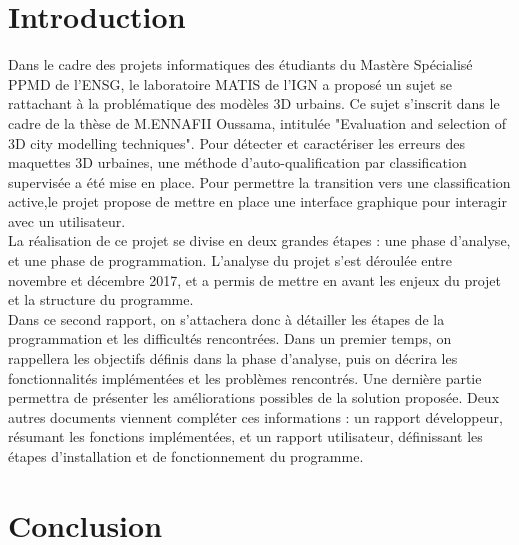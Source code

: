\documentclass{themeensg}
\begin{document}
\newpage
\chapter*{Introduction}
  
  \vspace{1.5cm}
Dans le cadre des projets informatiques des étudiants du Mastère Spécialisé PPMD de l’ENSG,
le laboratoire MATIS de l’IGN a proposé un sujet se rattachant à la problématique des modèles 3D
urbains. Ce sujet s’inscrit dans le cadre de la thèse de M.ENNAFII Oussama, intitulée "Evaluation and selection of 3D city modelling techniques". Pour détecter et caractériser les erreurs des maquettes 3D urbaines, une méthode d’auto-qualification par classification supervisée a été mise en place. Pour permettre la transition vers une classification active,le projet propose de mettre en place une interface graphique pour interagir avec un utilisateur.\\

La réalisation de ce projet se divise en deux grandes étapes : une phase d'analyse, et une phase de programmation. L'analyse du projet s'est déroulée entre novembre et décembre 2017, et a permis de mettre en avant les enjeux du projet et la structure du programme. \\

Dans ce second rapport, on s'attachera donc à détailler les étapes de la programmation et les difficultés rencontrées. Dans un premier temps, on rappellera les objectifs définis dans la phase d'analyse, puis on décrira les fonctionnalités implémentées et les problèmes rencontrés. Une dernière partie permettra de présenter les améliorations possibles de la solution proposée. Deux autres documents viennent compléter ces informations : un rapport développeur, résumant les fonctions implémentées, et un rapport utilisateur, définissant les étapes d'installation et de fonctionnement du programme. 






\newpage
\chapter*{Conclusion}
  \vspace{1.5cm}
\end{document}
